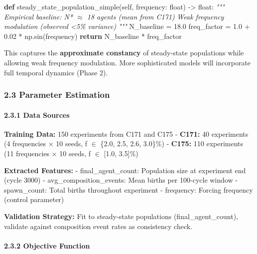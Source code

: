 \documentclass[
]{article}
\newenvironment{Shaded}{}{}
\newcommand{\BuiltInTok}[1]{\textcolor[rgb]{0.00,0.50,0.00}{#1}}
\newcommand{\CommentTok}[1]{\textcolor[rgb]{0.38,0.63,0.69}{\textit{#1}}}
\newcommand{\ControlFlowTok}[1]{\textcolor[rgb]{0.00,0.44,0.13}{\textbf{#1}}}
\newcommand{\FloatTok}[1]{\textcolor[rgb]{0.25,0.63,0.44}{#1}}
\newcommand{\KeywordTok}[1]{\textcolor[rgb]{0.00,0.44,0.13}{\textbf{#1}}}
\newcommand{\NormalTok}[1]{#1}
\newcommand{\OperatorTok}[1]{\textcolor[rgb]{0.40,0.40,0.40}{#1}}
\newcommand{\VariableTok}[1]{\textcolor[rgb]{0.10,0.09,0.49}{#1}}
\begin{document}
\begin{Shaded}
\begin{Highlighting}[]
\KeywordTok{def}\NormalTok{ steady\_state\_population\_simple(}\VariableTok{self}\NormalTok{, frequency: }\BuiltInTok{float}\NormalTok{) }\OperatorTok{{-}\textgreater{}} \BuiltInTok{float}\NormalTok{:}
    \CommentTok{"""}
\CommentTok{    Empirical baseline: N* $\approx$ 18 agents (mean from C171)}
\CommentTok{    Weak frequency modulation (observed \textless{}5\% variance)}
\CommentTok{    """}
\NormalTok{    N\_baseline }\OperatorTok{=} \FloatTok{18.0}
\NormalTok{    freq\_factor }\OperatorTok{=} \FloatTok{1.0} \OperatorTok{+} \FloatTok{0.02} \OperatorTok{*}\NormalTok{ np.sin(frequency)}
    \ControlFlowTok{return}\NormalTok{ N\_baseline }\OperatorTok{*}\NormalTok{ freq\_factor}
\end{Highlighting}
\end{Shaded}

This captures the \textbf{approximate constancy} of steady-state
populations while allowing weak frequency modulation. More sophisticated
models will incorporate full temporal dynamics (Phase 2).

\subsubsection{2.3 Parameter Estimation}\label{parameter-estimation}

\paragraph{2.3.1 Data Sources}\label{data-sources}

\textbf{Training Data:} 150 experiments from C171 and C175 -
\textbf{C171:} 40 experiments (4 frequencies × 10 seeds, f $\in$ \{2.0, 2.5,
2.6, 3.0\}\%) - \textbf{C175:} 110 experiments (11 frequencies × 10
seeds, f $\in$ {[}1.0, 3.5{]}\%)

\textbf{Extracted Features:} - final\_agent\_count: Population size at
experiment end (cycle 3000) - avg\_composition\_events: Mean births per
100-cycle window - spawn\_count: Total births throughout experiment -
frequency: Forcing frequency (control parameter)

\textbf{Validation Strategy:} Fit to steady-state populations
(final\_agent\_count), validate against composition event rates as
consistency check.

\paragraph{2.3.2 Objective Function}\label{objective-function}
\end{document}
